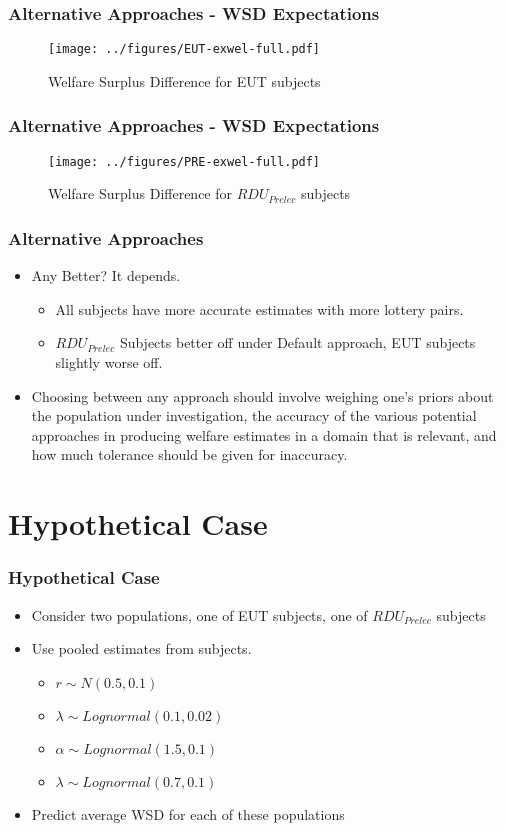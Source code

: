 \documentclass{beamer}
\begin{document}
\begin{frame}
\frametitle{Alternative Approaches - WSD Expectations}
	\begin{figure}[ht!]
		\center
		\caption{Welfare Surplus Difference for EUT subjects}
		\texttt{[image: ../figures/EUT-exwel-full.pdf]}
		\label{fig:exwel-eut}
	\end{figure}
\end{frame}

\begin{frame}
\frametitle{Alternative Approaches - WSD Expectations}
\begin{figure}[ht!]
	\center
	\caption{Welfare Surplus Difference for $\mathit{RDU_{Prelec}}$ subjects}
	\texttt{[image: ../figures/PRE-exwel-full.pdf]}
	\label{fig:exwel-pre}
\end{figure}
\end{frame}

\begin{frame}
\frametitle{Alternative Approaches}
\begin{itemize}
	\item Any Better? It depends.
		\begin{itemize}
			\item All subjects have more accurate estimates with more lottery pairs.
			\item $\mathit{RDU_{Prelec}}$ Subjects better off under Default approach, EUT subjects slightly worse off.
		\end{itemize}
	\item Choosing between any approach should involve weighing one's priors about the population under investigation, the accuracy of the various potential approaches in producing welfare estimates in a domain that is relevant, and how much tolerance should be given for inaccuracy.
\end{itemize}
\end{frame}

\section{Hypothetical Case}
\begin{frame}
\frametitle{Hypothetical Case}
\begin{itemize}
	\item Consider two populations, one of EUT subjects, one of $\mathit{RDU_{Prelec}}$ subjects
	\item Use pooled estimates from \textcite{Harrison2016} subjects.
		\begin{itemize}
			\item $r       \sim \mathit{N}(0.5, 0.1)$
			\item $\lambda \sim \mathit{Lognormal}(0.1, 0.02)$
			\item $\alpha  \sim \mathit{Lognormal}(1.5, 0.1)$
			\item $\lambda \sim \mathit{Lognormal}(0.7, 0.1)$
		\end{itemize}
	\item Predict average WSD for each of these populations
\end{itemize}
\end{frame}
\end{document}
